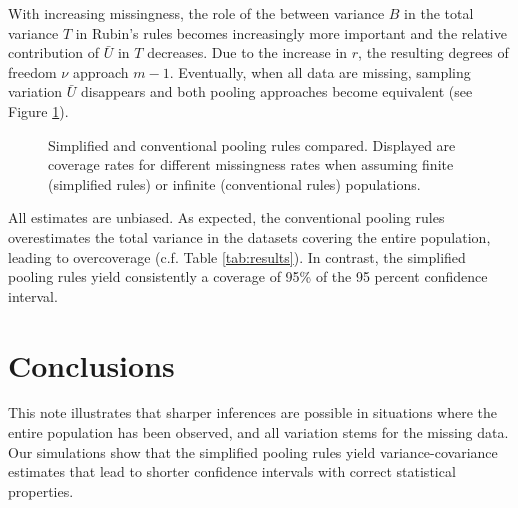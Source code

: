 \documentclass[12pt, a4paper]{article}
\begin{document}
With increasing missingness, the role of the between variance $B$ in the total variance $T$ in Rubin's rules becomes increasingly more important and the relative contribution of $\bar{U}$ in $T$ decreases. Due to the increase in $r$, the resulting degrees of freedom $\nu$ approach $m-1$. Eventually, when all data are missing, sampling variation $\bar{U}$ disappears and both pooling approaches become equivalent (see Figure \ref{covplot}). 
  \begin{figure}[t!]
     		\begin{center}
    		\end{center}  
		\caption{Simplified and conventional pooling rules compared. Displayed are coverage rates for different missingness rates when assuming finite (simplified rules) or infinite (conventional rules) populations.}  
  \label{covplot}    
 \end{figure}

All estimates are unbiased. As expected, the conventional pooling rules overestimates the total variance in the datasets covering the entire population, leading to overcoverage (c.f. Table \ref{tab:results}). In contrast, the simplified pooling rules yield consistently a coverage of 95\% of the 95 percent confidence interval. 


\section*{Conclusions}
This note illustrates that sharper inferences are possible in situations where the entire population has been observed, and all variation stems for the missing data. Our simulations show that the simplified pooling rules yield variance-covariance estimates that lead to shorter confidence intervals with correct statistical properties. 
\end{document}
